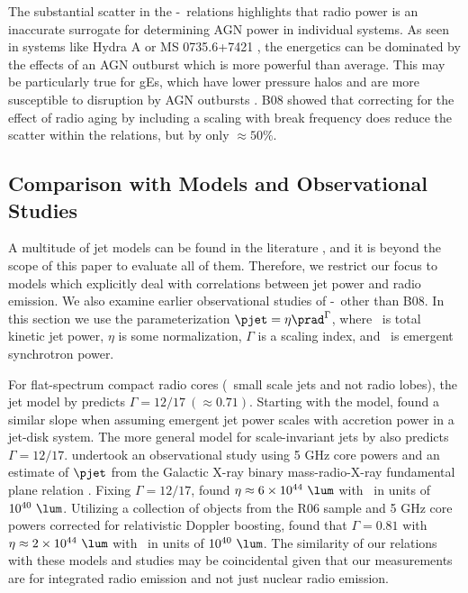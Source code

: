 \documentclass{emulateapj}
\begin{document}
The substantial scatter in the \pjet-\prad\ relations highlights that
radio power is an inaccurate surrogate for determining AGN power in
individual systems. As seen in systems like Hydra A \citep{hydraa} or
MS 0735.6+7421 \citep{ms0735}, the energetics can be dominated by the
effects of an AGN outburst which is more powerful than average. This
may be particularly true for gEs, which have lower pressure halos and
are more susceptible to disruption by AGN outbursts
\citep{2006MNRAS.372.1161W, 2008ApJ...687L..53P}. B08 showed that
correcting for the effect of radio aging by including a scaling with
break frequency does reduce the scatter within the relations, but by
only $\approx 50\%$.

\subsection{Comparison with Models and Observational Studies}
\label{sec:models}

A multitude of jet models can be found in the literature
\citep[\ie][]{1973MNRAS.164..243L, 1974MNRAS.166..513S,
  1974MNRAS.169..395B, 1987MNRAS.226..531G, 1989ApJ...345L..21B,
  2002ApJS..141..337C, 2002ApJS..141..371C}, and it is beyond the
scope of this paper to evaluate all of them. Therefore, we restrict
our focus to models which explicitly deal with correlations between
jet power and radio emission. We also examine earlier observational
studies of \pjet-\prad\ other than B08. In this section we use the
parameterization $\pjet = \eta \prad^{\Gamma}$, where \pjet\ is total
kinetic jet power, $\eta$ is some normalization, $\Gamma$ is a scaling
index, and \prad\ is emergent synchrotron power.

For flat-spectrum compact radio cores (\eg\ small scale jets and not
radio lobes), the jet model by \citet{1979ApJ...232...34B} predicts
$\Gamma = 12/17 ~(\approx 0.71)$. Starting with the
\citet{1979ApJ...232...34B} model, \citet{1995A&A...293..665F} found a
similar slope when assuming emergent jet power scales with accretion
power in a jet-disk system. The more general model for scale-invariant
jets by \citet{2003MNRAS.343L..59H} also predicts $\Gamma =
12/17$. \citet{2005ApJ...633..384H} undertook an observational study
using 5 GHz core powers and an estimate of $\pjet$ from the Galactic
X-ray binary mass-radio-X-ray fundamental plane relation
\citep{2003MNRAS.344...60G, 2003MNRAS.345.1057M}. Fixing $\Gamma =
12/17$, \citet{2005ApJ...633..384H} found $\eta \approx 6 \times
10^{44} ~\lum$ with \prad\ in units of $10^{40} ~\lum$.  Utilizing a
collection of objects from the R06 sample and 5 GHz core powers
corrected for relativistic Doppler boosting,
\citet{2007MNRAS.381..589M} found that $\Gamma = 0.81$ with $\eta
\approx 2 \times 10^{44} ~\lum$ with \prad\ in units of $10^{40}
~\lum$. The similarity of our relations with these models and studies
may be coincidental given that our measurements are for integrated
radio emission and not just nuclear radio emission.
\end{document}
